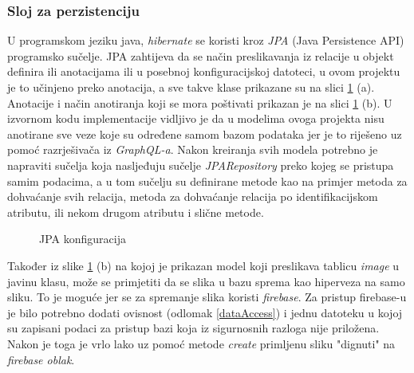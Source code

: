 \documentclass[times, utf8, zavrsni]{fer}
\begin{document}
\subsubsection{Sloj za perzistenciju}
U programskom jeziku java, \textit{hibernate} se koristi kroz \textit{JPA} (Java Persistence API) programsko sučelje.
JPA zahtijeva da se način preslikavanja iz relacije u objekt definira ili anotacijama
ili u posebnoj konfiguracijskoj datoteci, u ovom projektu je to učinjeno preko anotacija, a sve takve klase prikazane su na
slici \ref{fig:JPA} (a). Anotacije i način anotiranja koji se mora poštivati prikazan je na slici \ref{fig:JPA} (b).
U izvornom kodu implementacije vidljivo je
da u modelima ovoga projekta nisu anotirane sve veze koje su određene samom bazom podataka
jer je to riješeno uz pomoć razrješivača iz \textit{GraphQL-a}. Nakon kreiranja svih modela potrebno je napraviti sučelja koja nasljeđuju sučelje
\textit{JPARepository} preko kojeg se pristupa samim podacima, a u tom sučelju su definirane metode kao na primjer metoda
za dohvaćanje svih relacija, metoda za dohvaćanje relacija po identifikacijskom atributu, ili nekom drugom atributu
i slične metode.
\begin{figure}[h]
      \centering
      \caption{JPA konfiguracija}
      \label{fig:JPA}
\end{figure}
Također iz slike \ref{fig:JPA} (b)
na kojoj je prikazan model koji preslikava tablicu \textit{image} u javinu klasu,
može se primjetiti da se slika u bazu sprema kao hiperveza na samo sliku. To je moguće jer se za
spremanje slika koristi \textit{firebase}. Za pristup firebase-u je bilo potrebno dodati ovisnost (odlomak \ref{dataAccess}) i jednu datoteku u kojoj su zapisani
podaci za pristup bazi koja iz sigurnosnih razloga nije priložena. Nakon je toga je vrlo lako uz pomoć metode \textit{create} primljenu
sliku "dignuti" na \textit{firebase oblak}.
\newpage
\end{document}
